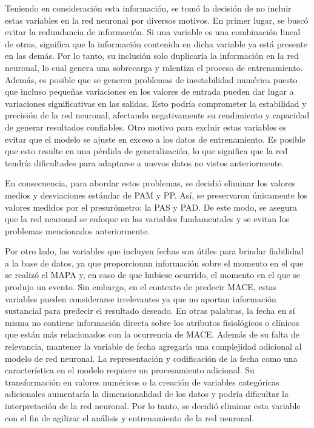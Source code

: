 Teniendo en consideración esta información, se tomó la decisión de no incluir estas variables en 
la red neuronal por diversos motivos. En primer lugar, se buscó evitar la redundancia de información. 
Si una variable es una combinación lineal de otras, significa que la información contenida en 
dicha variable ya está presente en las demás. Por lo tanto, su inclusión solo duplicaría la 
información en la red neuronal, lo cual genera una sobrecarga y ralentiza el proceso de 
entrenamiento. Además, es posible que se generen problemas de inestabilidad numérica puesto que incluso 
pequeñas variaciones en los valores de entrada pueden dar lugar a variaciones significativas 
en las salidas. Esto podría comprometer la estabilidad y precisión de la red neuronal, afectando 
negativamente su rendimiento y capacidad de generar resultados confiables. Otro motivo para 
excluir estas variables es evitar que el modelo se ajuste en exceso a los datos de entrenamiento. 
Es posible que esto resulte en una pérdida de generalización, lo que significa que la red tendría 
dificultades para adaptarse a nuevos datos no vistos anteriormente.

En consecuencia, para abordar estos problemas, se decidió eliminar los valores medios y desviaciones 
estándar de PAM y PP. Así, se preservaron únicamente los valores medidos por el presurómetro: la PAS y PAD. 
De este modo, se asegura que la red neuronal se enfoque en las variables fundamentales y se evitan 
los problemas mencionados anteriormente.

Por otro lado, las variables que incluyen fechas son útiles para brindar fiabilidad a 
la base de datos, ya que proporcionan información sobre el momento en el que se realizó el MAPA y, en caso 
de que hubiese ocurrido, el momento en el que se produjo un evento.
Sin embargo, en el contexto de predecir MACE, estas variables pueden considerarse irrelevantes ya 
que no aportan información sustancial para predecir el resultado deseado. En otras palabras, 
la fecha en sí misma no contiene información directa sobre los atributos fisiológicos o clínicos 
que están más relacionados con la ocurrencia de MACE. Además de su falta de 
relevancia, mantener la variable de fecha agregaría una complejidad adicional al modelo 
de red neuronal. La representación y codificación de la fecha como una característica en el 
modelo requiere un procesamiento adicional. Su transformación en valores numéricos o la 
creación de variables categóricas adicionales aumentaría la dimensionalidad de los datos 
y podría dificultar la interpretación de la red neuronal. Por lo tanto, se decidió eliminar 
esta variable con el fin de agilizar el análisis y entrenamiento de la red neuronal. 

